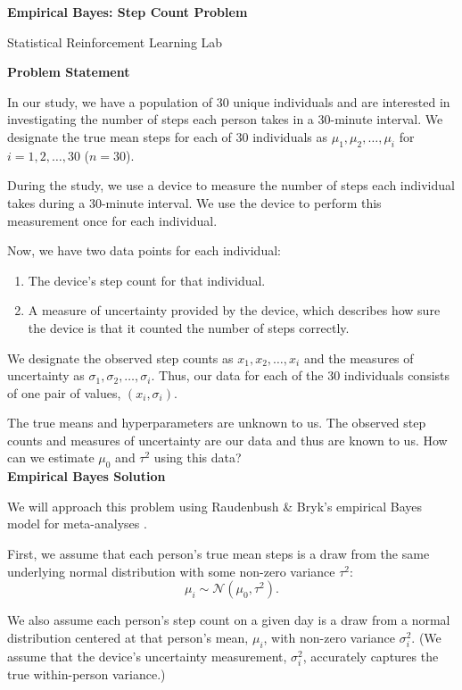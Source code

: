 \documentclass[letterpaper, 11pt]{extarticle}
\begin{document}
\begin{Large}
    \textsf{\textbf{Empirical Bayes: Step Count Problem}}   \par
    Statistical Reinforcement Learning Lab
\end{Large}

\vspace{2ex}

\textsf{\textbf{Problem Statement}}

In our study, we have a population of 30 unique individuals and are interested in investigating the number of steps each person takes in a 30-minute interval. We designate the true mean steps for each of 30 individuals as $\mu_1, \mu_2, \dots, \mu_i$ for $i=1, 2,\dots, 30$  ($n=30$). 

During the study, we use a device to measure the number of steps each individual takes during a 30-minute interval. We use the device to perform this measurement once for each individual. 

Now, we have two data points for each individual:\begin{enumerate}
\itemsep0em 
    \item The device's step count for that individual.
    \item A measure of uncertainty provided by the device, which describes how sure the device is that it counted the number of steps correctly.
\end{enumerate}
We designate the observed step counts as $x_1, x_2, \dots, x_i$ and the measures of uncertainty as $\sigma_1, \sigma_2, \dots, \sigma_i$. Thus, our data for each of the 30 individuals consists of one pair of values, $(x_i, \sigma_i)$. 

The true means and hyperparameters are unknown to us. The observed step counts and measures of uncertainty are our data and thus are known to us. How can we estimate $\mu_0$ and $\tau^2$ using this data?
\\

\textsf{\textbf{Empirical Bayes Solution}}

We will approach this problem using Raudenbush \& Bryk's empirical Bayes model for meta-analyses \cite{doi:10.3102/10769986010002075}. 

First, we assume that each person's true mean steps is a draw from the same underlying normal distribution with some non-zero variance $\tau^2$: $$\mu_i \sim \mathcal{N}(\mu_0, \tau^2).$$ 

We also assume each person's step count on a given day is a draw from a normal distribution centered at that person's mean, $\mu_i$, with non-zero variance $\sigma_i^2$. (We assume that the device's uncertainty measurement, $\sigma_i^2$, accurately captures the true within-person variance.)
\end{document}
